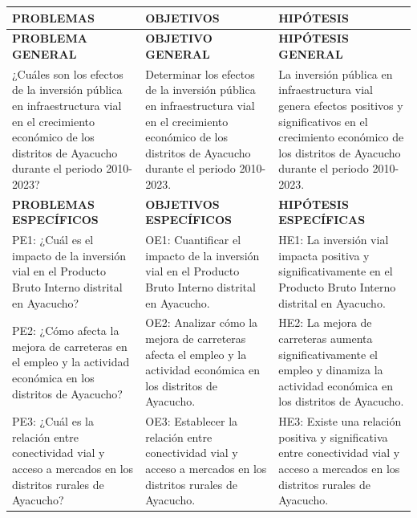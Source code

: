 \documentclass[
  man,
  floatsintext,
  longtable,
  a4paper,
  nolmodern,
  notxfonts,
  notimes,
  12pt,
  colorlinks=true,linkcolor=blue,citecolor=blue,urlcolor=blue]{apa7}
\newcounter{none} %
\begin{document}
{\def\LTcaptype{none} %
\begin{longtable}[]{@{}
  >{\raggedright\arraybackslash}p{}
  >{\raggedright\arraybackslash}p{}
  >{\raggedright\arraybackslash}p{}@{}}
\toprule\noalign{}
\begin{minipage}[b]{\linewidth}\raggedright
PROBLEMAS
\end{minipage} & \begin{minipage}[b]{\linewidth}\raggedright
OBJETIVOS
\end{minipage} & \begin{minipage}[b]{\linewidth}\raggedright
HIPÓTESIS
\end{minipage} \\
\midrule\noalign{}
\endhead
\bottomrule\noalign{}
\endlastfoot
\textbf{PROBLEMA GENERAL} & \textbf{OBJETIVO GENERAL} &
\textbf{HIPÓTESIS GENERAL} \\
¿Cuáles son los efectos de la inversión pública en infraestructura vial
en el crecimiento económico de los distritos de Ayacucho durante el
periodo 2010-2023? & Determinar los efectos de la inversión pública en
infraestructura vial en el crecimiento económico de los distritos de
Ayacucho durante el periodo 2010-2023. & La inversión pública en
infraestructura vial genera efectos positivos y significativos en el
crecimiento económico de los distritos de Ayacucho durante el periodo
2010-2023. \\
\textbf{PROBLEMAS ESPECÍFICOS} & \textbf{OBJETIVOS ESPECÍFICOS} &
\textbf{HIPÓTESIS ESPECÍFICAS} \\
PE1: ¿Cuál es el impacto de la inversión vial en el Producto Bruto
Interno distrital en Ayacucho? & OE1: Cuantificar el impacto de la
inversión vial en el Producto Bruto Interno distrital en Ayacucho. &
HE1: La inversión vial impacta positiva y significativamente en el
Producto Bruto Interno distrital en Ayacucho. \\
PE2: ¿Cómo afecta la mejora de carreteras en el empleo y la actividad
económica en los distritos de Ayacucho? & OE2: Analizar cómo la mejora
de carreteras afecta el empleo y la actividad económica en los distritos
de Ayacucho. & HE2: La mejora de carreteras aumenta significativamente
el empleo y dinamiza la actividad económica en los distritos de
Ayacucho. \\
PE3: ¿Cuál es la relación entre conectividad vial y acceso a mercados en
los distritos rurales de Ayacucho? & OE3: Establecer la relación entre
conectividad vial y acceso a mercados en los distritos rurales de
Ayacucho. & HE3: Existe una relación positiva y significativa entre
conectividad vial y acceso a mercados en los distritos rurales de
Ayacucho. \\
\end{longtable}
}
\end{document}
